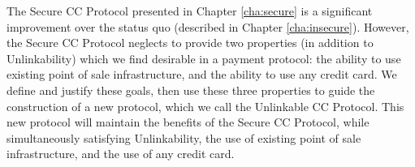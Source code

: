 The Secure CC Protocol presented in Chapter \ref{cha:secure} is a significant improvement over the status quo (described in Chapter \ref{cha:insecure}).
However, the Secure CC Protocol neglects to provide two properties (in addition to Unlinkability) which we find desirable in a payment protocol:
  the ability to use existing point of sale infrastructure, and the ability to use any credit card.
We define and justify these goals, then use these three properties to guide the construction of a new protocol, which we call the Unlinkable CC Protocol.
This new protocol will maintain the benefits of the Secure CC Protocol, while simultaneously satisfying Unlinkability,
  the use of existing point of sale infrastructure, and the use of any credit card.
